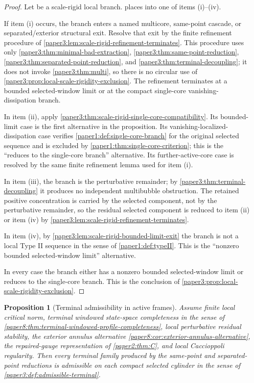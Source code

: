 \documentclass[11pt]{amsart}
\def\({}%
\def\){}%
\theoremstyle{plain}
\newtheorem{proposition}[proposition]{Proposition}
\theoremstyle{definition}
\theoremstyle{remark}
\begin{document}
\begin{proof}
Let \(\omega\) be a scale-rigid local branch.
 places \(\omega\) into
one of items (i)--(iv).

If item (i) occurs, the branch enters a named multicore, same-point cascade, or
separated/exterior structural exit.  Resolve that exit by the finite
refinement procedure of
\cref{paper3:lem:scale-rigid-refinement-terminates}.  This procedure uses only
\cref{paper3:thm:minimal-bad-extraction},
\cref{paper3:thm:same-point-reduction},
\cref{paper3:thm:separated-point-reduction}, and
\cref{paper3:thm:terminal-decoupling}; it does not invoke
\cref{paper3:thm:multi}, so there is no circular use of
\cref{paper3:prop:local-scale-rigidity-exclusion}.  The refinement terminates at a bounded
selected-window limit or at the compact single-core
vanishing-dissipation branch.

In item (ii), apply
\cref{paper3:thm:scale-rigid-single-core-compatibility}.  Its bounded-limit
case is the first alternative in the proposition.  Its
vanishing-localized-dissipation case verifies
\cref{paper1:def:single-core-branch} for the original selected sequence and is
excluded by \cref{paper1:thm:single-core-criterion}; this is the
``reduces to the single-core branch'' alternative.  Its further-active-core
case is resolved by the same finite refinement lemma used for item (i).

In item (iii), the branch is the perturbative remainder; by
\cref{paper3:thm:terminal-decoupling} it produces no independent
multibubble obstruction.  The retained positive concentration is carried by
the selected component, not by the perturbative remainder, so the residual
selected component is reduced to item (ii) or item (iv) by
\cref{paper3:lem:scale-rigid-refinement-terminates}.

In item (iv), by
\cref{paper3:lem:scale-rigid-bounded-limit-exit} the branch is not a local
Type II sequence in the sense of \cref{paper1:def:typeII}.  This is the
``nonzero bounded selected-window limit'' alternative.

In every case the branch either has a nonzero bounded selected-window limit
or reduces to the single-core branch.  This is the conclusion of
\cref{paper3:prop:local-scale-rigidity-exclusion}.
\end{proof}

\begin{proposition}[Terminal admissibility in active frames]\label{paper3:prop:terminal-admissibility-active-frames}
Assume finite local critical norm, terminal windowed state-space completeness in
the sense of \cref{paper8:thm:terminal-windowed-profile-completeness}, local
perturbative residual stability, the exterior annulus alternative
\cref{paper8:cor:exterior-annulus-alternative}, the repaired-gauge representation
of \cref{paper2:thm:C}, and local Caccioppoli regularity.  Then every terminal
family produced by the same-point and separated-point reductions is admissible
on each compact selected cylinder in the sense of
\cref{paper3:def:admissible-terminal}.
\end{proposition}
\end{document}
